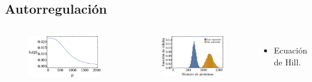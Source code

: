 \documentclass[xcolor=dvipsnames]{beamer}
\begin{document}
\subsection{Autorregulaci\'on}
\begin{frame}
\begin{columns}[c]

\begin{figure}[p]
    \centering
    \includegraphics[width=1\textwidth]{Pmas-hill}
\end{figure}
\vspace{-5mm}
\begin{figure}[p]
    \centering
    \includegraphics[width=1\textwidth]{Pmas-hist}
\end{figure}


\begin{itemize}

\item Ecuaci\'on de Hill.


\end{itemize}
\end{columns}
\end{frame}
\end{document}
